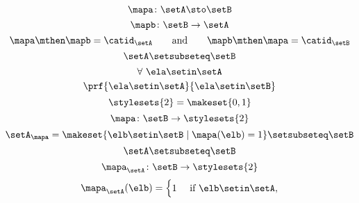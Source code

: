 \begin{forslides}
    \begin{equation}
        \label{eq:slides_session2_183}
        \mapa\colon \setA \sto \setB
    \end{equation}
    \begin{equation}
        \label{eq:slides_session2_184}
        \mapb \colon \setB \to \setA
    \end{equation}
    \begin{equation}
        \label{eq:slides_session2_185}
        \mapa \mthen \mapb = \catid_\setA \qquad \text{and}  \qquad \mapb \mthen \mapa = \catid_\setB
    \end{equation}
    \begin{equation}
        \label{eq:slides_session2_186}
        \setA \setsubseteq \setB
    \end{equation}
    \begin{equation}
        \label{eq:slides_session2_187}
        \forall \ \ela \setin\setA
    \end{equation}
    \begin{equation}
        \label{eq:slides_session2_188}
        \prf{
            \ela \setin\setA
        }{
            \ela \setin\setB
        }
    \end{equation}
    \begin{equation}
        \label{eq:slides_session2_189}
        \stylesets{2} = \makeset{ 0, 1}
    \end{equation}
    \begin{equation}
        \label{eq:slides_session2_190}
        \mapa \colon \setB \to \stylesets{2}
    \end{equation}
    \begin{equation}
        \label{eq:slides_session2_191}
        \setA_\mapa = \makeset{ \elb \setin\setB \mid \mapa(\elb) = 1 } \setsubseteq \setB
    \end{equation}
    \begin{equation}
        \label{eq:slides_session2_192}
        \setA \setsubseteq \setB
    \end{equation}
    \begin{equation}
        \label{eq:slides_session2_193}
        \mapa_\setA \colon \setB \to \stylesets{2}
    \end{equation}
    \begin{equation}
        \label{eq:slides_session2_194}
        \mapa_\setA(\elb) = \begin{cases}
            1 & \text{ if }\elb\setin\setA, \\

\end{cases}
\end{equation}
\end{forslides}
